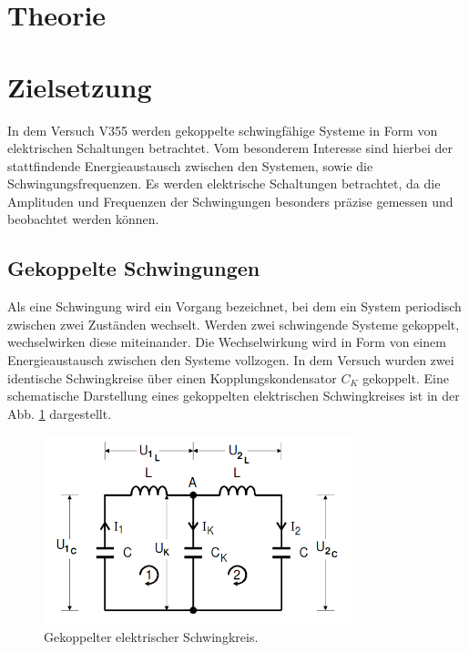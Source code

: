 \setcounter{page}{1}

\section{Theorie}

\section{Zielsetzung}

In dem Versuch V355 werden gekoppelte schwingfähige Systeme in Form von elektrischen
Schaltungen betrachtet. Vom besonderem Interesse sind hierbei der stattfindende
Energieaustausch zwischen den Systemen, sowie die Schwingungsfrequenzen.
Es werden elektrische Schaltungen betrachtet, da die Amplituden und Frequenzen
der Schwingungen besonders präzise gemessen und beobachtet werden können.

\subsection{Gekoppelte Schwingungen}

Als eine Schwingung wird ein Vorgang bezeichnet, bei dem ein System periodisch
zwischen zwei Zuständen wechselt. Werden zwei schwingende Systeme gekoppelt,
wechselwirken diese miteinander. Die Wechselwirkung wird in Form von einem
Energieaustausch zwischen den Systeme vollzogen. In dem Versuch wurden zwei identische
Schwingkreise über einen Kopplungskondensator $C_K$ gekoppelt. Eine schematische
Darstellung eines gekoppelten elektrischen Schwingkreises ist in der Abb.
\ref{fig:gekoppelterSchwingkreis} dargestellt.

\begin{figure}
  \centering
  \includegraphics[width=9cm]{V355_allg_Schwingkreis.png}
  \caption{Gekoppelter elektrischer Schwingkreis.\cite{anleitung01}\protect}
  \label{fig:gekoppelterSchwingkreis}
\end{figure}


